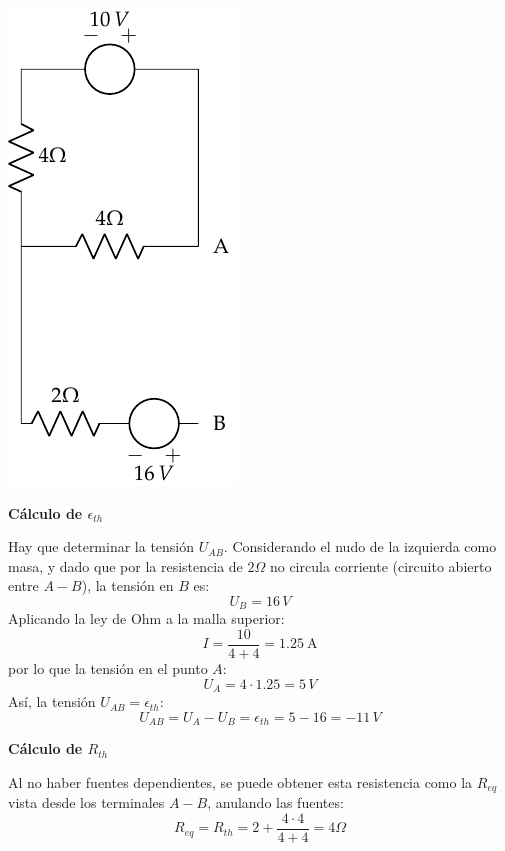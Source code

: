 \begin{center}
  \includegraphics{figuras/BT1_17_mallas.pdf}
\end{center}


\textbf{Cálculo de $\epsilon_{th}$}

Hay que determinar la tensión $U_{AB}$. Considerando el nudo de la
izquierda como masa, y dado que por la resistencia de $2\Omega$ no
circula corriente (circuito abierto entre $A-B$), la tensión en $B$
es:
\begin{equation*}
  U_B=16\,V
\end{equation*}
Aplicando la ley de Ohm a la malla superior:
\begin{equation*}
  I=\dfrac{10}{4+4}=\qty{1.25}{\ampere}
\end{equation*}
por lo que la tensión en el punto $A$:
\begin{equation*}
  U_A=4\cdot 1.25=5\,V
\end{equation*}
Así, la tensión $U_{AB}=\epsilon_{th}$:
\begin{equation*}
  U_{AB}=U_A-U_B=\epsilon_{th}=5-16=-11\,V
\end{equation*}

\textbf{Cálculo de $R_{th}$}

Al no haber fuentes dependientes, se puede obtener esta resistencia
como la $R_{eq}$ vista desde los terminales $A-B$, anulando las
fuentes:
\begin{equation*}
  R_{eq}=R_{th}=2+\dfrac{4\cdot 4}{4+4}=4\Omega
\end{equation*}

